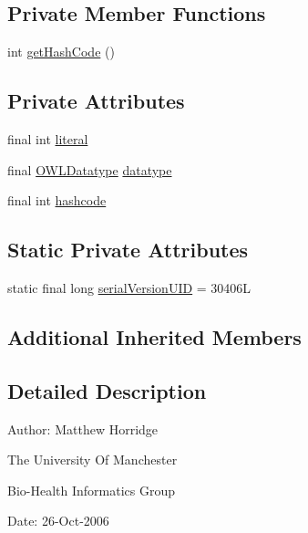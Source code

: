 \subsection*{Private Member Functions}
\begin{DoxyCompactItemize}
\item 
int \hyperlink{classuk_1_1ac_1_1manchester_1_1cs_1_1owl_1_1owlapi_1_1_o_w_l_literal_impl_integer_a96da2f5e59fe5d5b52d364aa6e21ec20}{get\-Hash\-Code} ()
\end{DoxyCompactItemize}
\subsection*{Private Attributes}
\begin{DoxyCompactItemize}
\item 
final int \hyperlink{classuk_1_1ac_1_1manchester_1_1cs_1_1owl_1_1owlapi_1_1_o_w_l_literal_impl_integer_a498ac09735c90af8cec19e67dbecb487}{literal}
\item 
final \hyperlink{interfaceorg_1_1semanticweb_1_1owlapi_1_1model_1_1_o_w_l_datatype}{O\-W\-L\-Datatype} \hyperlink{classuk_1_1ac_1_1manchester_1_1cs_1_1owl_1_1owlapi_1_1_o_w_l_literal_impl_integer_a0b5d743acd63ccb7fe6dbee958224ef6}{datatype}
\item 
final int \hyperlink{classuk_1_1ac_1_1manchester_1_1cs_1_1owl_1_1owlapi_1_1_o_w_l_literal_impl_integer_a1c454bb9e99e5fff27b312f5e283c659}{hashcode}
\end{DoxyCompactItemize}
\subsection*{Static Private Attributes}
\begin{DoxyCompactItemize}
\item 
static final long \hyperlink{classuk_1_1ac_1_1manchester_1_1cs_1_1owl_1_1owlapi_1_1_o_w_l_literal_impl_integer_abc729d111ea101a213b0f0649ed57cf9}{serial\-Version\-U\-I\-D} = 30406\-L
\end{DoxyCompactItemize}
\subsection*{Additional Inherited Members}


\subsection{Detailed Description}
Author\-: Matthew Horridge\par
 The University Of Manchester\par
 Bio-\/\-Health Informatics Group\par
 Date\-: 26-\/\-Oct-\/2006\par
 \par
 

